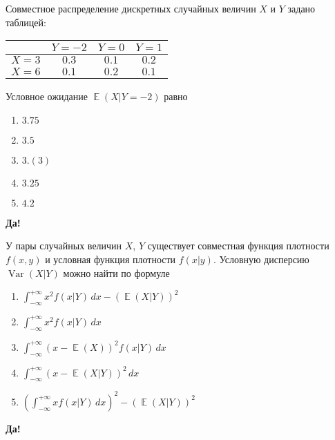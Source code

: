 \documentclass[t]{beamer}
\DeclareMathOperator{\Var}{Var}
\DeclareMathOperator{\E}{\mathbb{E}}
\begin{document}
 \begin{frame} \label{6-Yes} 
\begin{block}{6} 

Совместное распределение дискретных случайных величин $X$ и $Y$ задано таблицей:

\begin{center}
	\begin{tabular}{cccc}
		\toprule
		& $Y=-2$ & $Y=0$ & $Y=1$ \\
		\midrule
		$X=3$ & $0.3$ & $0.1$ & $0.2$  \\
		$X=6$ & $0.1$ & $0.2$ & $0.1$ \\
		\bottomrule
	\end{tabular}
\end{center}

Условное ожидание $\E(X|Y=-2)$ равно

 


 \end{block} 
\begin{enumerate} 
\item[] \hyperlink{6-Yes}{\beamergotobutton{} $3.75$}
\item[] \hyperlink{6-No}{\beamergotobutton{} $3.5$}
\item[] \hyperlink{6-No}{\beamergotobutton{} $3.(3)$}
\item[] \hyperlink{6-No}{\beamergotobutton{} $3.25$}
\item[] \hyperlink{6-No}{\beamergotobutton{} $4.2$}
\end{enumerate} 

 \textbf{Да!} 
 \hyperlink{7}{}\end{frame} 


 \begin{frame} \label{7-Yes} 
\begin{block}{7} 

У пары случайных величин $X$, $Y$ существует совместная функция плотности $f(x,y)$ и условная функция плотности $f(x|y)$. Условную дисперсию $\Var(X|Y)$ можно найти по формуле
  


 \end{block} 
\begin{enumerate} 
\item[] \hyperlink{7-Yes}{\beamergotobutton{} $\int_{-\infty}^{+\infty} x^2 f(x|Y) \, dx - (\E(X|Y))^2$}
\item[] \hyperlink{7-No}{\beamergotobutton{} $\int_{-\infty}^{+\infty} x^2 f(x|Y) \, dx$}
\item[] \hyperlink{7-No}{\beamergotobutton{} $\int_{-\infty}^{+\infty} (x - \E(X))^2 f(x|Y) \, dx$}
\item[] \hyperlink{7-No}{\beamergotobutton{} $\int_{-\infty}^{+\infty} (x - \E(X|Y))^2 \, dx$}
\item[] \hyperlink{7-No}{\beamergotobutton{} $\left(\int_{-\infty}^{+\infty} x f(x|Y) \, dx\right)^2 - (\E(X|Y))^2$}
\end{enumerate} 

 \textbf{Да!} 
 \hyperlink{8}{}\end{frame} 
\end{document}
